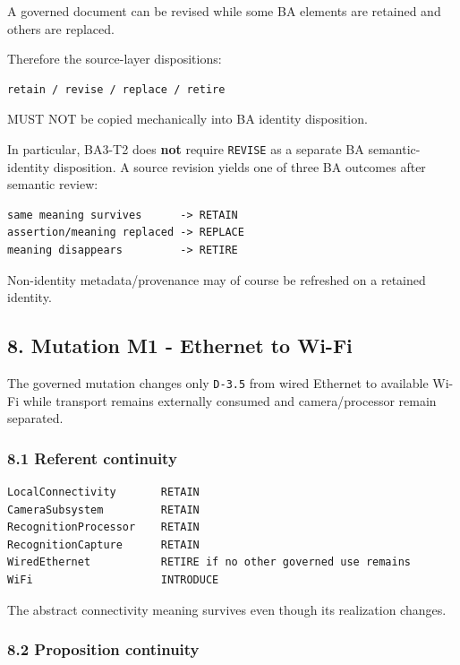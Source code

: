 \documentclass[11pt,a4paper]{article}
\begin{document}
A governed document can be revised while some BA elements are retained
and others are replaced.

Therefore the source-layer dispositions:

\begin{verbatim}
retain / revise / replace / retire
\end{verbatim}

MUST NOT be copied mechanically into BA identity disposition.

In particular, BA3-T2 does \textbf{not} require \texttt{REVISE} as a
separate BA semantic-identity disposition. A source revision yields one
of three BA outcomes after semantic review:

\begin{verbatim}
same meaning survives      -> RETAIN
assertion/meaning replaced -> REPLACE
meaning disappears         -> RETIRE
\end{verbatim}

Non-identity metadata/provenance may of course be refreshed on a
retained identity.

\subsection{8. Mutation M1 - Ethernet to
Wi-Fi}\label{mutation-m1---ethernet-to-wi-fi}

The governed mutation changes only \texttt{D-3.5} from wired Ethernet to
available Wi-Fi while transport remains externally consumed and
camera/processor remain separated.

\subsubsection{8.1 Referent continuity}\label{referent-continuity}

\begin{verbatim}
LocalConnectivity       RETAIN
CameraSubsystem         RETAIN
RecognitionProcessor    RETAIN
RecognitionCapture      RETAIN
WiredEthernet           RETIRE if no other governed use remains
WiFi                    INTRODUCE
\end{verbatim}

The abstract connectivity meaning survives even though its realization
changes.

\subsubsection{8.2 Proposition continuity}\label{proposition-continuity}
\end{document}
